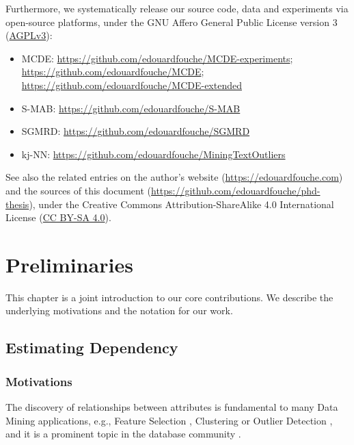 Furthermore, we systematically release our source code, data and experiments via open-source platforms, under the GNU Affero General Public License version 3 (\href{https://www.gnu.org/licenses/agpl-3.0.en.html}{AGPLv3}): 

\begin{itemize}
	\item \gls{MCDE}: \url{https://github.com/edouardfouche/MCDE-experiments}; \url{https://github.com/edouardfouche/MCDE}; \url{https://github.com/edouardfouche/MCDE-extended}
	\item \gls{S-MAB}: \url{https://github.com/edouardfouche/S-MAB}
	\item \gls{SGMRD}: \url{https://github.com/edouardfouche/SGMRD} 
	\item \gls{kj-NN}: \url{https://github.com/edouardfouche/MiningTextOutliers} 
\end{itemize}

See also the related entries on the author's website  (\url{https://edouardfouche.com}) and the sources of this document (\url{https://github.com/edouardfouche/phd-thesis}), under the Creative Commons Attribution-ShareAlike 4.0 International License (\href{https://creativecommons.org/licenses/by-sa/4.0/}{CC BY-SA 4.0}).

\chapter{Preliminaries}
\glsresetall
\label{chapter:preliminaries}

This chapter is a joint introduction to our core contributions. %
We describe the underlying motivations and the notation for our work. %

\section{Estimating Dependency}

\subsection{Motivations}  

The discovery of relationships between attributes is fundamental to many Data Mining applications, e.g., Feature Selection \cite{DBLP:journals/pami/PengLD05}, Clustering \cite{DBLP:conf/sdm/BohmKMNV13} or Outlier Detection \cite{DBLP:conf/icde/KellerMB12}, and it is a prominent topic in the database community \cite{DBLP:journals/tkde/ChenHY96, DBLP:conf/vldb/ZhuS02, DBLP:journals/tkde/HallH03}. 

